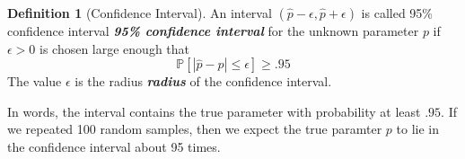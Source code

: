 \documentclass[10pt]{article}
\theoremstyle{definition}
\newtheorem{definition}[theorem]{Definition}
\newcommand{\1}[1]{\textbf{1}_{\left[#1\right]}} %
\def\P{\mathbb{P}} %
\DeclareRobustCommand{\demph}[1]{%
  \ifmmode
  {\color{Blue}#1}%
  \else
  {\color{Blue}\bfseries\slshape #1}%
  \fi
}
\begin{document}
\begin{definition}[Confidence Interval]
  An interval $(\widehat{p}-\epsilon,\widehat{p}+\epsilon)$ is called
  \demph{95\% confidence interval} for the unknown parameter $p$ if
  $\epsilon>0$ is chosen large enough that
  \begin{equation}\label{eq:19}
    \P\left[\left| \widehat{p}-p \right| \leq \epsilon\right] \geq .95
  \end{equation}
  The value $\epsilon$ is the \demph{radius} of the confidence interval.
\end{definition}
In words, the interval contains the true parameter with probability at least
$.95$. If we repeated 100 random samples, then we expect the true paramter $p$
to lie in the confidence interval about 95 times.
\end{document}
